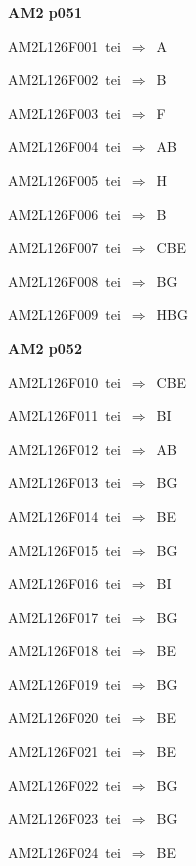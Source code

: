 \par\vfill\eject
{\bf\hfill AM2 p051\hfill\hbox{}}\par\bigskip
{\sixrm AM2L126F001\ {\sixit tei}\ }$\Rightarrow$\ A\par\smallskip
{\sixrm AM2L126F002\ {\sixit tei}\ }$\Rightarrow$\ B\par\smallskip
{\sixrm AM2L126F003\ {\sixit tei}\ }$\Rightarrow$\ F\par\smallskip
{\sixrm AM2L126F004\ {\sixit tei}\ }$\Rightarrow$\ AB\par\smallskip
{\sixrm AM2L126F005\ {\sixit tei}\ }$\Rightarrow$\ H\par\smallskip
{\sixrm AM2L126F006\ {\sixit tei}\ }$\Rightarrow$\ B\par\smallskip
{\sixrm AM2L126F007\ {\sixit tei}\ }$\Rightarrow$\ CBE\par\smallskip
{\sixrm AM2L126F008\ {\sixit tei}\ }$\Rightarrow$\ BG\par\smallskip
{\sixrm AM2L126F009\ {\sixit tei}\ }$\Rightarrow$\ HBG\par\smallskip

\par\vfill\eject
{\bf\hfill AM2 p052\hfill\hbox{}}\par\bigskip
{\sixrm AM2L126F010\ {\sixit tei}\ }$\Rightarrow$\ CBE\par\smallskip
{\sixrm AM2L126F011\ {\sixit tei}\ }$\Rightarrow$\ BI\par\smallskip
{\sixrm AM2L126F012\ {\sixit tei}\ }$\Rightarrow$\ AB\par\smallskip
{\sixrm AM2L126F013\ {\sixit tei}\ }$\Rightarrow$\ BG\par\smallskip
{\sixrm AM2L126F014\ {\sixit tei}\ }$\Rightarrow$\ BE\par\smallskip
{\sixrm AM2L126F015\ {\sixit tei}\ }$\Rightarrow$\ BG\par\smallskip
{\sixrm AM2L126F016\ {\sixit tei}\ }$\Rightarrow$\ BI\par\smallskip
{\sixrm AM2L126F017\ {\sixit tei}\ }$\Rightarrow$\ BG\par\smallskip
{\sixrm AM2L126F018\ {\sixit tei}\ }$\Rightarrow$\ BE\par\smallskip
{\sixrm AM2L126F019\ {\sixit tei}\ }$\Rightarrow$\ BG\par\smallskip
{\sixrm AM2L126F020\ {\sixit tei}\ }$\Rightarrow$\ BE\par\smallskip
{\sixrm AM2L126F021\ {\sixit tei}\ }$\Rightarrow$\ BE\par\smallskip
{\sixrm AM2L126F022\ {\sixit tei}\ }$\Rightarrow$\ BG\par\smallskip
{\sixrm AM2L126F023\ {\sixit tei}\ }$\Rightarrow$\ BG\par\smallskip
{\sixrm AM2L126F024\ {\sixit tei}\ }$\Rightarrow$\ BE\par\smallskip

